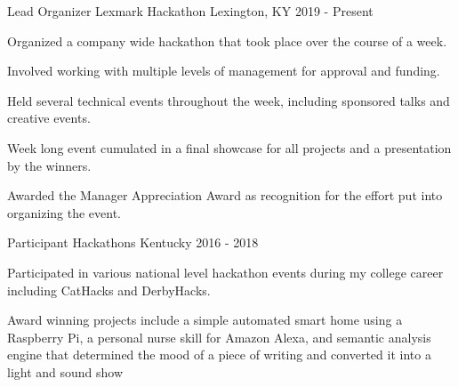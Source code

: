 

\begin{cventries}

  \cventry
    {Lead Organizer} %
    {Lexmark Hackathon} %
    {Lexington, KY} %
    {2019 - Present} %
    {
      \begin{cvitems} %
        \item {Organized a company wide hackathon that took place over the course of a week.}
        \item {Involved working with multiple levels of management for approval and funding.}
        \item {Held several technical events throughout the week, including sponsored talks and creative events.}
	\item {Week long event cumulated in a final showcase for all projects and a presentation by the winners.}
	\item {Awarded the Manager Appreciation Award as recognition for the effort put into organizing the event.}
      \end{cvitems}
    }

  \cventry
    {Participant} %
    {Hackathons} %
    {Kentucky} %
    {2016 - 2018} %
    {
      \begin{cvitems} %
        \item {Participated in various national level hackathon events during my college career including CatHacks and DerbyHacks.}
	\item {Award winning projects include a simple automated smart home using a Raspberry Pi, a personal nurse skill for Amazon Alexa, and semantic analysis engine that determined the mood of a piece of writing and converted it into a light and sound show}
      \end{cvitems}
    }

\iffalse
  \cventry
    {Member} %
    {Competative Programming Team} %
    {University of Kentucky} %
    {Aug. 2015 - 2017} %
    {
      \begin{cvitems} %
        \item {Represented the university in national programming competitions.}
      \end{cvitems}
    }
\fi
\end{cventries}
